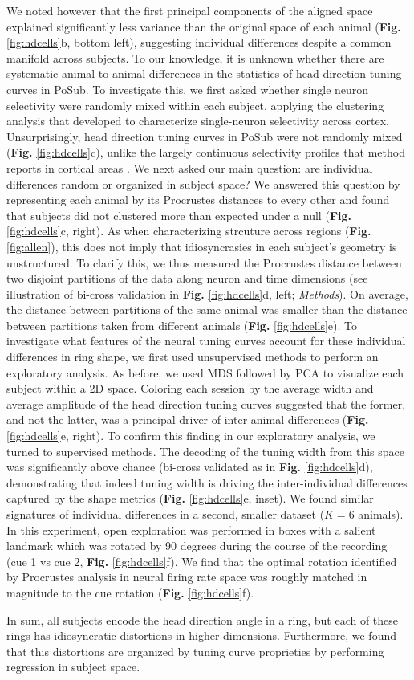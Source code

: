 We noted however that the first principal components of the aligned space explained significantly less variance than the original space of each animal (\textbf{Fig.} \ref{fig:hdcells}b, bottom left), suggesting individual differences despite a common manifold across subjects. To our knowledge, it is unknown whether there are systematic animal-to-animal differences in the statistics of head direction tuning curves in PoSub. To investigate this, we first asked whether single neuron selectivity were randomly mixed within each subject, applying the clustering analysis that \textcite{posani2026} developed to characterize single-neuron selectivity across cortex. Unsurprisingly, head direction tuning curves in PoSub were not randomly mixed (\textbf{Fig.} \ref{fig:hdcells}c), unlike the largely continuous selectivity profiles that method reports in cortical areas \textcite{posani2026}. We next asked our main question: are individual differences random or organized in subject space? We answered this question by representing each animal by its Procrustes distances to every other and found that subjects did not clustered more than expected under a null (\textbf{Fig.} \ref{fig:hdcells}c, right). As when characterizing strcuture across regions (\textbf{Fig. }\ref{fig:allen}), this does not imply that idiosyncrasies in each subject's geometry is unstructured. To clarify this, we thus measured the Procrustes distance between two disjoint partitions of the data along neuron and time dimensions (see illustration of bi-cross validation in \textbf{Fig.} \ref{fig:hdcells}d, left; \textit{Methods}). On average, the distance between partitions of the same animal was smaller than the distance between partitions taken from different animals (\textbf{Fig.} \ref{fig:hdcells}e). To investigate what features of the neural tuning curves account for these individual differences in ring shape, we first used unsupervised methods to perform an exploratory analysis.
As before, we used MDS followed by PCA to visualize each subject within a 2D space. Coloring each session by the average width and average amplitude of the head direction tuning curves suggested that the former, and not the latter, was a principal driver of inter-animal differences (\textbf{Fig.} \ref{fig:hdcells}e, right). 
To confirm this finding in our exploratory analysis, we turned to supervised methods.
The decoding of the tuning width from this space was significantly above chance (bi-cross validated as in \textbf{Fig.} \ref{fig:hdcells}d), demonstrating that indeed tuning width is driving the inter-individual differences captured by the shape metrics (\textbf{Fig.} \ref{fig:hdcells}e, inset). We found similar signatures of individual differences in a second, smaller dataset ($K = 6$ animals).
In this experiment, open exploration was performed in boxes with a salient landmark which was rotated by 90 degrees during the course of the recording (cue 1 vs cue 2, \textbf{Fig.} \ref{fig:hdcells}f).
We find that the optimal rotation identified by Procrustes analysis in neural firing rate space was roughly matched in magnitude to the cue rotation (\textbf{Fig.} \ref{fig:hdcells}f).

In sum, all subjects encode the head direction angle in a ring, but each of these rings has idiosyncratic distortions in higher dimensions. Furthermore, we found that this distortions are organized by tuning curve proprieties by performing regression in subject space. 

  

